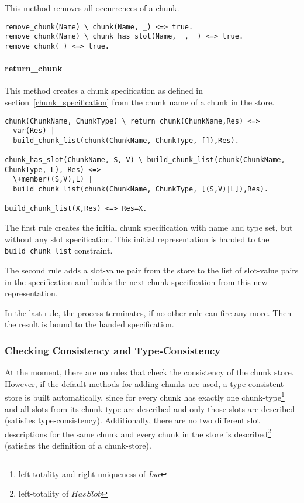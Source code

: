 This method removes all occurrences of a chunk.

\begin{lstlisting}
remove_chunk(Name) \ chunk(Name, _) <=> true.
remove_chunk(Name) \ chunk_has_slot(Name, _, _) <=> true.
remove_chunk(_) <=> true.
\end{lstlisting}

\paragraph{return\_chunk}

This method creates a chunk specification as defined in section~\ref{chunk_specification} from the chunk name of a chunk in the store.

\begin{lstlisting}[caption={rules for \texttt{return\_chunk}}]
chunk(ChunkName, ChunkType) \ return_chunk(ChunkName,Res) <=> 
  var(Res) | 
  build_chunk_list(chunk(ChunkName, ChunkType, []),Res).

chunk_has_slot(ChunkName, S, V) \ build_chunk_list(chunk(ChunkName, ChunkType, L), Res) <=> 
  \+member((S,V),L) | 
  build_chunk_list(chunk(ChunkName, ChunkType, [(S,V)|L]),Res).
  
build_chunk_list(X,Res) <=> Res=X.
\end{lstlisting}

The first rule creates the initial chunk specification with name and type set, but without any slot specification. This initial representation is handed to the \verb|build_chunk_list| constraint.

The second rule adds a slot-value pair from the store to the list of slot-value pairs in the specification and builds the next chunk specification from this new representation.

In the last rule, the process terminates, if no other rule can fire any more. Then the result is bound to the handed specification.

\subsubsection{Checking Consistency and Type-Consistency}

At the moment, there are no rules that check the consistency of the chunk store. However, if the default methods for adding chunks are used, a type-consistent store is built automatically, since for every chunk has exactly one chunk-type\footnote{left-totality and right-uniqueness of $Isa$} and all slots from its chunk-type are described and only those slots are described (satisfies type-consistency). Additionally, there are no two different slot descriptions for the same chunk and every chunk in the store is described\footnote{left-totality of $HasSlot$} (satisfies the definition of a chunk-store).

